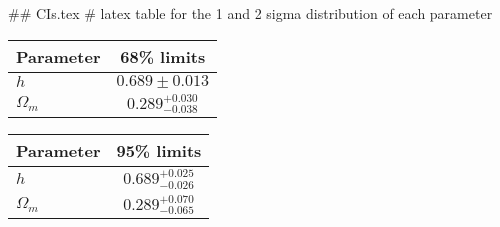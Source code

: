 ## CIs.tex
# latex table for the 1 and 2 sigma distribution of each parameter

\begin{tabular} { l  c}
 Parameter &  68\% limits\\
\hline
{\boldmath$h              $} & $0.689\pm 0.013            $\\
{\boldmath$\Omega_m       $} & $0.289^{+0.030}_{-0.038}   $\\
\hline
\end{tabular}

\begin{tabular} { l  c}
 Parameter &  95\% limits\\
\hline
{\boldmath$h              $} & $0.689^{+0.025}_{-0.026}   $\\
{\boldmath$\Omega_m       $} & $0.289^{+0.070}_{-0.065}   $\\
\hline
\end{tabular}

